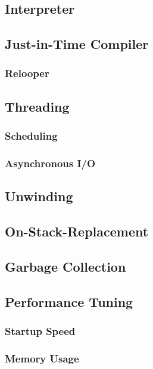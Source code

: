 \documentclass{acm_proc_article-sp}
\begin{document}
\subsection{Interpreter}

\subsection{Just-in-Time Compiler}

\subsubsection{Relooper}

\subsection{Threading}

\subsubsection{Scheduling}

\subsubsection{Asynchronous I/O}

\subsection{Unwinding}

\subsection{On-Stack-Replacement}

\subsection{Garbage Collection}

\subsection{Performance Tuning}

\subsubsection{Startup Speed}

\subsubsection{Memory Usage}
\end{document}
